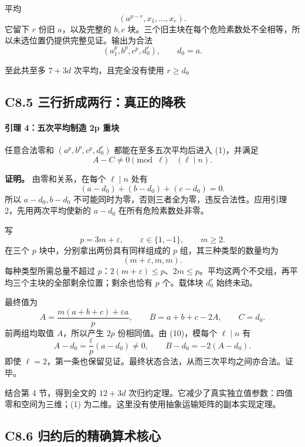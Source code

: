 {平均} \[
(a^{p-r},x_1,\ldots,x_r).
\] {它留下} \(r\) {份旧} \(a\){，以及完整的} \(b,c\) {块。三个旧主块在每个危险素数处不全相等，所以未选位置仍提供完整见证。输出为合法} \[
(a_1^p,b^p,c^p,d_0^r),\qquad d_0=a.
\tag{C8.8}
\]

{至此共至多} \(7+3d\) {次平均，且完全没有使用} \(r\ge d\){。}

\subsection*{\texorpdfstring{{C8.5} {三行折成两行：真正的降秩}}{C8.5 三行折成两行：真正的降秩}}\label{C8-h56}

\paragraph*{\texorpdfstring{{引理} {4：五次平均制造} {2p} {重块}}{引理 4：五次平均制造 2p 重块}}\label{C8-h57}

{任意合法零和} \((a^p,b^p,c^p,d_0^r)\) {都能在至多五次平均后进入} {(1)，并满足} \[
A-C\ne0\pmod\ell\quad(\ell\mid n).
\tag{C8.9}
\]

\textbf{{证明。}} {由零和关系，在每个} \(\ell\mid n\) {处有} \[
(a-d_0)+(b-d_0)+(c-d_0)=0.
\tag{C8.10}
\] {所以} \(a-d_0,b-d_0\) {不可能同时为零，否则三者全为零，违反合法性。应用引理} {2，先用两次平均使新的} \(a-d_0\) {在所有危险素数处非零。}

{写} \[
p=3m+\varepsilon,\qquad \varepsilon\in\{1,-1\},\qquad m\ge2.
\] {在三个} \(p\) {块中，分别拿出两份具有同样组成的} \(p\) {组，其三种类型的数量均为} \[
(m+\varepsilon,m,m).
\tag{C8.11}
\] {每种类型所需总量不超过} \(p\){：}\(2(m+\varepsilon)\le p\){、}\(2m\le p\){。平均这两个不交组，再平均三个主块的全部剩余位置；剩余也恰有} \(p\) {个。载体块} \(d_0^r\) {始终未动。}

{最终值为} \[
A=\frac{m(a+b+c)+\varepsilon a}{p},\qquad
B=a+b+c-2A,\qquad C=d_0.
\tag{C8.12}
\] {前两组均取值} \(A\){，所以产生} \(2p\) {份相同值。由} {(10)，模每个} \(\ell\mid n\) {有} \[
A-d_0=\frac\varepsilon p(a-d_0)\ne0,\qquad
B-d_0=-2(A-d_0).
\tag{C8.13}
\] {即使} \(\ell=2\){，第一条也保留见证。最终状态合法，从而三次平均之间亦合法。证毕。}

{结合第} {4} {节，得到全文的} \(12+3d\) {次归约定理。它减少了真实独立值参数：四值零和空间为三维；(1)} {为二维。这里没有使用抽象运输矩阵的副本实现定理。}

\subsection*{\texorpdfstring{{C8.6} {归约后的精确算术核心}}{C8.6 归约后的精确算术核心}}\label{C8-h58}

